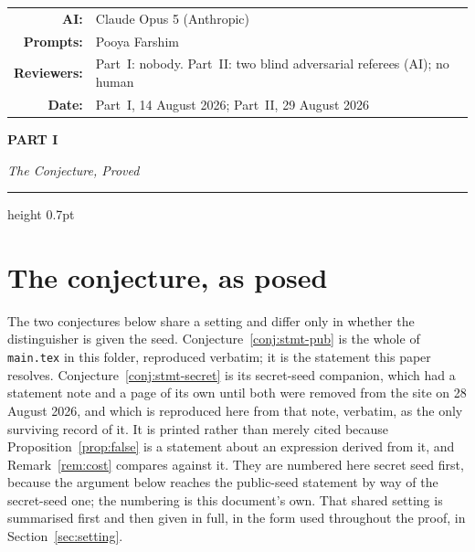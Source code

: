 \documentclass{aicr-solution}
\makeatletter
\newcommand{\cjpart}[2]{%
  \clearpage
  {\noindent\sffamily\bfseries\color{cjAccent}\footnotesize PART #1}\par
  \vspace{0.35em}%
  {\noindent\LARGE\itshape #2\par}
  \vspace{0.5em}%
  {\color{cjAccent}\hrule height 0.7pt}%
  \vspace{1.4em}%
}
\newcommand{\AIModelsUsed}{Claude Opus 5 (Anthropic)}
\newcommand{\PromptedBy}{Pooya Farshim}
\newcommand{\AIDisclosure}{%
  \begingroup
  \small\centering
  \begin{tabular}{@{}rl@{}}
    \textbf{AI:} & \AIModelsUsed \\
    \textbf{Prompts:} & \PromptedBy \\
    \textbf{Reviewers:} & Part~I: nobody. Part~II: two blind adversarial referees (AI); no human \\
    \textbf{Date:} & Part~I, 14 August 2026; Part~II, 29 August 2026 \\
  \end{tabular}
  \par
  \endgroup
}
\makeatother
\begin{document}

\vspace{0.6em}
\AIDisclosure

\vspace{1em}


\cjpart{I}{The Conjecture, Proved}

\section{The conjecture, as posed}\label{sec:posed}

The two conjectures below share a setting and differ only in whether the distinguisher is given
the seed. Conjecture~\ref{conj:stmt-pub} is the whole of \texttt{main.tex} in this folder,
reproduced verbatim; it is the statement this paper resolves.
Conjecture~\ref{conj:stmt-secret} is its secret-seed companion, which had a statement note and a
page of its own until both were removed from the site on 28 August 2026, and which is reproduced
here from that note, verbatim, as the only surviving record of it. It is printed rather than merely
cited because Proposition~\ref{prop:false} is a statement about an expression derived from it, and
Remark~\ref{rem:cost} compares against it. They are numbered here secret seed first, because the
argument below reaches the public-seed statement by way of the secret-seed one; the numbering is
this document's own. That shared setting is summarised first and then given in full, in the form
used throughout the proof, in Section~\ref{sec:setting}.
\end{document}
